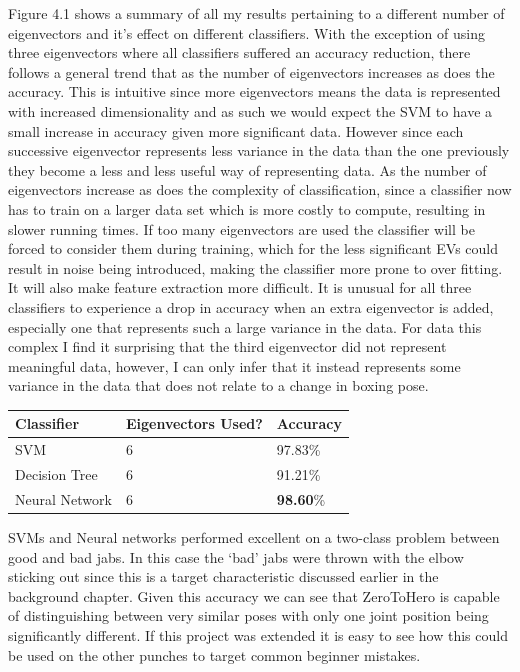Figure 4.1 shows a summary of all my results pertaining to a different number of eigenvectors and it's effect on different classifiers.
With the exception of using three eigenvectors where all classifiers suffered an accuracy reduction, there follows a general trend that as the number of eigenvectors increases as does the accuracy. This is intuitive since more eigenvectors means the data is represented with increased dimensionality and as such we would expect the SVM to have a small increase in accuracy given more significant data. However since each successive eigenvector represents less variance in the data than the one previously they become a less and less useful way of representing data. 
As the number of eigenvectors increase as does the complexity of classification, since a classifier now has to train on a larger data set which is more costly to compute, resulting in slower running times. If too many eigenvectors are used the classifier will be forced to consider them during training, which for the less significant EVs could result in noise being introduced, making the classifier more prone to over fitting. It will also make feature extraction more difficult.
It is unusual for all three classifiers to experience a drop in accuracy when an extra eigenvector is added, especially one that represents such a large variance in the data. For data this complex I find it surprising that the third eigenvector did not represent meaningful data, however, I can only infer that it instead represents some variance in the data that does not relate to a change in boxing pose.


\begin{table}[h]
\begin{center}
    \begin{tabular}{ | l | l | l |}
    \hline
    Classifier & Eigenvectors Used? & Accuracy\\ \hline
    SVM & 6 & 97.83\%\\ \hline
    Decision Tree & 6 & 91.21\%\\ \hline
    Neural Network & 6 & {\bf98.60}\%\\ \hline
    \hline
    \end{tabular}
\end{center}
\end{table}

SVMs and Neural networks performed excellent on a two-class problem between good and bad jabs. In this case the `bad' jabs were thrown with the elbow sticking out since this is a target characteristic discussed earlier in the background chapter. Given this accuracy we can see that ZeroToHero is capable of distinguishing between very similar poses with only one joint position being significantly different. If this project was extended it is easy to see how this could be used on the other punches to target common beginner mistakes.

